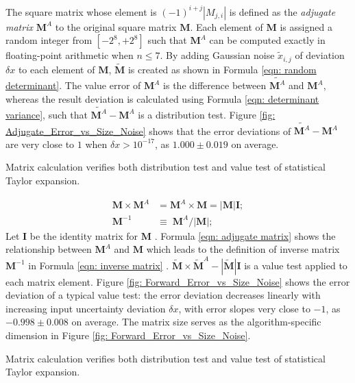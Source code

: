 \documentclass[twoside]{article}
\numberwithin{equation}{section}
\begin{document}
The square matrix whose element is $(-1)^{i+j}|M_{j,i}|$ is defined as the \emph{adjugate matrix} \cite{Linear_Algebra} $\mathbf{M}^A$ to the original square matrix $\mathbf{M}$. 
Each element of $\mathbf{M}$ is assigned a random integer from $[-2^8, +2^8]$ such that $\mathbf{M}^A$ can be computed exactly in floating-point arithmetic when $n \leq 7$.
By adding Gaussian noise $\tilde{x}_{i,j}$ of deviation $\delta x$ to each element of $\mathbf{M}$, $\widetilde{\mathbf{M}}$ is created as shown in Formula \eqref{eqn: random determinant}.
The value error of $\mathbf{M}^A$ is the difference between $\widetilde{\mathbf{M}^A}$ and $\mathbf{M}^A$, whereas the result deviation is calculated using Formula \eqref{eqn: determinant variance}, such that $\widetilde{\mathbf{M}^A} - \mathbf{M}^A$ is a distribution test.
Figure \ref{fig: Adjugate_Error_vs_Size_Noise} shows that the error deviations of $\widetilde{\mathbf{M}^A} - \mathbf{M}^A$ are very close to $1$ when $\delta x > 10^{-17}$, as $1.000 \pm 0.019$ on average.

Matrix calculation verifies both distribution test and value test of statistical Taylor expansion.

\begin{align}
\label{eqn: adjugate matrix}
\mathbf{M} \times \mathbf{M}^A &= \mathbf{M}^A \times \mathbf{M} = |\mathbf{M}| \mathbf{I}; \\
\label{eqn: inverse matrix}
\mathbf{M}^{-1} &\equiv\; \mathbf{M}^A / |\mathbf{M}|;
\end{align}
Let $\mathbf{I}$ be the identity matrix for $\mathbf{M}$ \cite{Linear_Algebra}.
Formula \eqref{eqn: adjugate matrix} shows the relationship between $\mathbf{M}^A$ and $\mathbf{M}$ which leads to the definition of inverse matrix $\mathbf{M}^{-1}$ in Formula \eqref{eqn: inverse matrix} \cite{Linear_Algebra}.
$\tilde{\mathbf{M}} \times \tilde{\mathbf{M}}^A - |\tilde{\mathbf{M}}| \mathbf{I}$ is a value test applied to each matrix element.
Figure \ref{fig: Forward_Error_vs_Size_Noise} shows the error deviation of a typical value test: the error deviation decreases linearly with increasing input uncertainty deviation $\delta x$, with error slopes very close to $-1$, as $-0.998 \pm 0.008$ on average.
The matrix size serves as the algorithm-specific dimension in Figure \ref{fig: Forward_Error_vs_Size_Noise}.

Matrix calculation verifies both distribution test and value test of statistical Taylor expansion.
\end{document}
